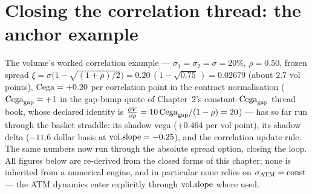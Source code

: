\section{Closing the correlation thread: the anchor example}
\label{sec:volII3:thread}

The volume's worked correlation example --- $\sigma_1 = \sigma_2 = \sigma =
20\%$, $\rho = 0.50$, frozen spread $\xi = \sigma\bigl(1 -
\sqrt{(1+\rho)/2}\bigr) = 0.20\,(1 - \sqrt{0.75}\,) = 0.02679$ (about $2.7$
vol points), $\mathrm{Cega} = +0.20$ per correlation point in the contract
normalisation ($\mathrm{Cega}_{\mathrm{gap}} = +1$ in the gap-bump quote of Chapter~2's
constant-$\mathrm{Cega}_{\mathrm{gap}}$ thread book, whose declared identity is
$\frac{\partial V}{\partial \rho} = 10\,\mathrm{Cega}_{\mathrm{gap}}/(1-\rho) = 20$) --- has so far run
through the basket straddle: its shadow vega ($+0.464$ per vol point), its
shadow delta ($-11.6$ dollar basis at $\mathrm{vol.slope} = -0.25$), and the
correlation update rule. The same numbers now run through the absolute
spread option, closing the loop. All figures below are re-derived from the
closed forms of this chapter; none is inherited from a numerical engine, and
in particular none relies on $\sigma_{\mathrm{ATM}} = \text{const}$ --- the ATM dynamics enter
explicitly through $\mathrm{vol.slope}$ where used.

